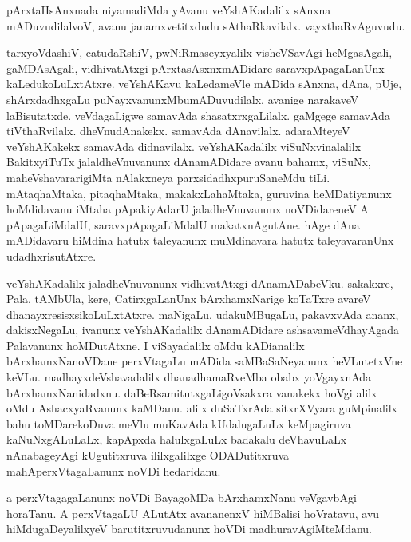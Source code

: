 \documentclass{article}
\begin{document}
\begin{mn}%
pArxtaHsAnxnada niyamadiMda yAvanu veYshAKadalilx sAnxna mADuvudilalvoV, avanu 
janamxvetitxdudu sAthaRkavilalx. vayxthaRvAguvudu.
\end{mn}

\begin{mn}%
tarxyoVdashiV, catudaRshiV, pwNiRmaseyxyalilx visheVSavAgi heMgasAgali, gaMDAsAgali, 
vidhivatAtxgi pArxtasAsxnxmADidare saravxpApagaLanUnx kaLedukoLuLxtAtxre. veYshAKavu 
kaLedameVle mADida sAnxna, dAna, pUje, shArxdadhxgaLu puNayxvanunxMbumADuvudilalx. 
avanige narakaveV laBisutatxde. veVdagaLigwe samavAda shasatxrxgaLilalx. gaMgege samavAda 
tiVthaRvilalx. dheVnudAnakekx. samavAda dAnavilalx. adaraMteyeV veYshAKakekx samavAda 
didnavilalx. veYshAKadalilx viSuNxvinalalilx BakitxyiTuTx jalaldheVnuvanunx dAnamADidare 
avanu bahamx, viSuNx, maheVshavararigiMta nAlakxneya parxsidadhxpuruSaneMdu tiLi. 
mAtaqhaMtaka, pitaqhaMtaka, makakxLahaMtaka, guruvina heMDatiyanunx hoMdidavanu iMtaha 
pApakiyAdarU jaladheVnuvanunx noVDidareneV A pApagaLiMdalU, saravxpApagaLiMdalU 
makatxnAgutAne. hAge dAna mADidavaru hiMdina hatutx taleyanunx muMdinavara hatutx 
taleyavaranUnx udadhxrisutAtxre.
\end{mn}


\begin{mn}%
veYshAKadalilx jaladheVnuvanunx vidhivatAtxgi dAnamADabeVku. sakakxre, Pala, tAMbUla, 
kere, CatirxgaLanUnx bArxhamxNarige koTaTxre avareV dhanayxresisxsikoLuLxtAtxre. maNigaLu, 
udakuMBugaLu, pakavxvAda ananx, dakisxNegaLu, ivanunx veYshAKadalilx dAnamADidare 
ashsavameVdhayAgada Palavanunx hoMDutAtxne. I viSayadalilx oMdu kADianalilx 
bArxhamxNanoVDane perxVtagaLu mADida saMBaSaNeyanunx heVLutetxVne keVLu. 
madhayxdeVshavadalilx dhanadhamaRveMba obabx yoVgayxnAda bArxhamxNanidadxnu. 
daBeRsamitutxgaLigoVsakxra vanakekx hoVgi alilx oMdu AshacxyaRvanunx kaMDanu. alilx 
duSaTxrAda sitxrXVyara guMpinalilx bahu toMDarekoDuva meVlu muKavAda kUdalugaLuLx 
keMpagiruva kaNuNxgALuLaLx, kapApxda halulxgaLuLx badakalu deVhavuLaLx nAnabageyAgi 
kUgutitxruva ililxgalilxge ODADutitxruva mahAperxVtagaLanunx noVDi hedaridanu.
\end{mn}

\begin{mn}%
a perxVtagagaLanunx noVDi BayagoMDa  bArxhamxNanu veVgavbAgi horaTanu. A perxVtagaLU 
ALutAtx avananenxV hiMBalisi hoVratavu, avu hiMdugaDeyalilxyeV barutitxruvudanunx hoVDi 
madhuravAgiMteMdanu.
\end{mn}
\end{document}
